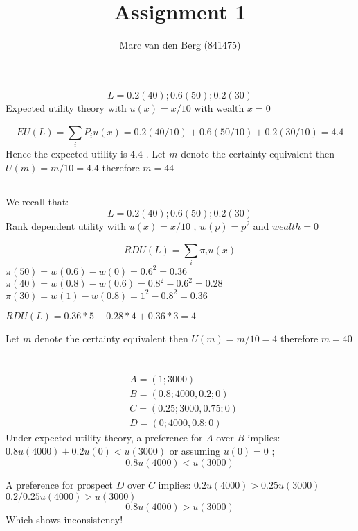 \documentclass[a4paper]{article}
\title{Assignment 1}
\author{Marc van den Berg (841475)}
\begin{document}
\maketitle

\section{}
\subsection{}
\begin{equation}
L=0.2(40); 0.6(50); 0.2(30)
\end{equation}
Expected utility theory with 
\(u(x)=x/10\) with wealth \(x=0\)

\begin{equation}
EU(L)= \sum_{i}^{} P_iu(x)= 0.2(40/10)+0.6(50/10)+0.2(30/10)=4.4
\end{equation}
Hence the expected utility is \(4.4\) . Let \(m\) denote the certainty equivalent then \(U(m)=m/10 = 4.4\) therefore \(m=44\)

\subsection{}

We recall that: \[L=0.2(40); 0.6(50); 0.2(30)\]
Rank dependent utility with \(u(x)=x/10\) , \(w(p)=p^2\)
 and \(wealth = 0\)
 
\[ RDU(L) = \sum_{i}^{} \pi_iu(x)\]
 \(\pi(50) = w(0.6) - w(0) = 0.6^2 = 0.36\)
 \(\pi(40) = w(0.8) - w(0.6) = 0.8^2 - 0.6^2 = 0.28 \)
 \(\pi(30) = w(1) - w(0.8) = 1^2 - 0.8^2 = 0.36\)
 
\(RDU(L) = 0.36*5 + 0.28*4 + 0.36*3 = 4\)

 Let \(m\) denote the certainty equivalent then \(U(m)=m/10 = 4\) therefore \(m=40\)
 
 \section{}


\begin{equation}
\begin{split}
& A=(1;3000)\\
& B=(0.8;4000 , 0.2;0)\\
& C=(0.25;3000 , 0.75;0)\\
& D=(0;4000 , 0.8;0)
\end{split}
\end{equation}
Under expected utility theory, a preference for \(A\) over \(B\) implies:
\(0.8u(4000) + 0.2u(0)<u(3000)\) or assuming \(u(0)=0\) ; 
\[0.8u(4000)<u(3000)\]


A preference for prospect \(D\) over \(C\) implies:
\(0.2u(4000) > 0.25u(3000)\) 
\(0.2/0.25u(4000)>u(3000)\)
\[0.8u(4000)>u(3000)\]
Which shows inconsistency!
\end{document}
